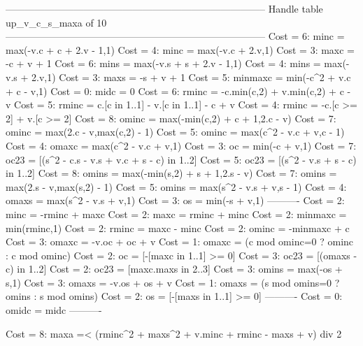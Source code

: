 --------------------------------------------------------------------------------
Handle table up_v_c_s_maxa of 10
--------------------------------------------------------------------------------
Cost =  6:  minc    = max(-v.c + c + 2.v - 1,1)
Cost =  4:  minc    = max(-v.c + 2.v,1)
Cost =  3:  maxc    = -c + v + 1
Cost =  6:  mins    = max(-v.s + s + 2.v - 1,1)
Cost =  4:  mins    = max(-v.s + 2.v,1)
Cost =  3:  maxs    = -s + v + 1
Cost =  5:  minmaxc = min(-c^2 + v.c + c - v,1)
Cost =  0:  midc    = 0
Cost =  6:  rminc   = -c.min(c,2) + v.min(c,2) + c - v
Cost =  5:  rminc   = c.[c in 1..1] - v.[c in 1..1] - c + v
Cost =  4:  rminc   = -c.[c >= 2] + v.[c >= 2]
Cost =  8:  ominc   = max(-min(c,2) + c + 1,2.c - v)
Cost =  7:  ominc   = max(2.c - v,max(c,2) - 1)
Cost =  5:  ominc   = max(c^2 - v.c + v,c - 1)
Cost =  4:  omaxc   = max(c^2 - v.c + v,1)
Cost =  3:  oc      = min(-c + v,1)
Cost =  7:  oc23    = [(s^2 - c.s - v.s + v.c + s - c) in 1..2]
Cost =  5:  oc23    = [(s^2 - v.s + s - c) in 1..2]
Cost =  8:  omins   = max(-min(s,2) + s + 1,2.s - v)
Cost =  7:  omins   = max(2.s - v,max(s,2) - 1)
Cost =  5:  omins   = max(s^2 - v.s + v,s - 1)
Cost =  4:  omaxs   = max(s^2 - v.s + v,1)
Cost =  3:  os      = min(-s + v,1)
----------
Cost =  2:  minc    = -rminc + maxc
Cost =  2:  maxc    = rminc + minc
Cost =  2:  minmaxc = min(rminc,1)
Cost =  2:  rminc   = maxc - minc
Cost =  2:  ominc   = -minmaxc + c
Cost =  3:  omaxc   = -v.oc + oc + v
Cost =  1:  omaxc   = (c mod ominc=0 ? ominc : c mod ominc)
Cost =  2:  oc      = [-[maxc in 1..1] >= 0]
Cost =  3:  oc23    = [(omaxs - c) in 1..2]
Cost =  2:  oc23    = [maxc.maxs in 2..3]
Cost =  3:  omins   = max(-os + s,1)
Cost =  3:  omaxs   = -v.os + os + v
Cost =  1:  omaxs   = (s mod omins=0 ? omins : s mod omins)
Cost =  2:  os      = [-[maxs in 1..1] >= 0]
----------
Cost =  0:  omidc   = midc
----------

Cost =  8:  maxa =< (rminc^2 + maxs^2 + v.minc + rminc - maxs + v) div 2

